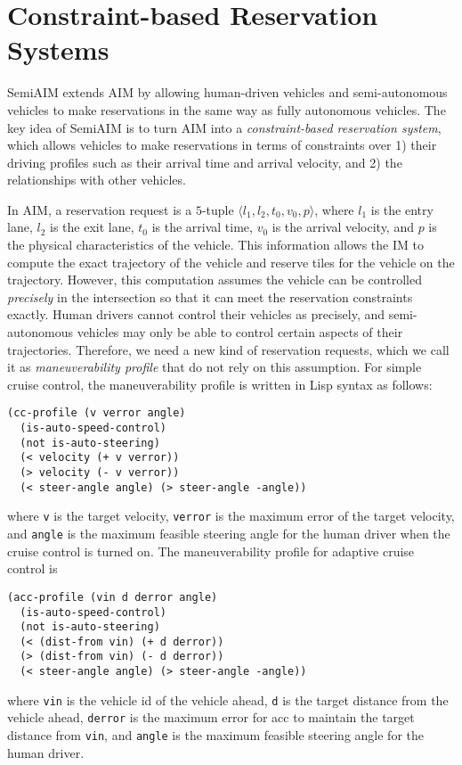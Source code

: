 \section{Constraint-based Reservation Systems}
\label{sec:constraint}

SemiAIM extends AIM by allowing human-driven vehicles and
semi-autonomous vehicles to make reservations in the same way as
fully autonomous vehicles.  The key idea of SemiAIM is to turn AIM into a
\emph{constraint-based reservation system}, which allows vehicles to
make reservations in terms of constraints over 1) their driving
profiles such as their arrival time and arrival velocity, and 2) the
relationships with other vehicles.

In AIM, a reservation request is a $5$-tuple $\langle l_1, l_2, t_0,
v_0, p\rangle$, where $l_1$ is the entry lane, $l_2$ is the exit lane,
$t_0$ is the arrival time, $v_0$ is the arrival velocity, and $p$ is
the physical characteristics of the vehicle.  This information allows
the IM to compute the exact trajectory of the vehicle and reserve
tiles for the vehicle on the trajectory.  However, this computation
assumes the vehicle can be controlled \emph{precisely} in the
intersection so that it can meet the reservation constraints exactly.
Human drivers cannot control their vehicles as precisely, and
semi-autonomous vehicles may only be able to control certain aspects
of their trajectories.  Therefore, we need a new kind of reservation
requests, which we call it as \textit{maneuverability profile} that do
not rely on this assumption. For simple cruise control, the
maneuverability profile is written in Lisp syntax as follows:
\begin{small}
\begin{verbatim}
(cc-profile (v verror angle)
  (is-auto-speed-control)
  (not is-auto-steering)
  (< velocity (+ v verror))
  (> velocity (- v verror))
  (< steer-angle angle) (> steer-angle -angle))
\end{verbatim}
\end{small}
\noindent
where \texttt{v} is the target velocity, \texttt{verror} is the
maximum error of the target velocity, and \texttt{angle} is the
maximum feasible steering angle for the human driver when the cruise
control is turned on.  The maneuverability profile for adaptive cruise
control is
\begin{small}
\begin{verbatim}
(acc-profile (vin d derror angle)
  (is-auto-speed-control)
  (not is-auto-steering)
  (< (dist-from vin) (+ d derror))
  (> (dist-from vin) (- d derror))
  (< steer-angle angle) (> steer-angle -angle))
\end{verbatim}
\end{small}
\noindent
where \texttt{vin} is the vehicle id of the vehicle ahead,
\texttt{d} is the target distance from the vehicle ahead, \texttt{derror}
is the maximum error for acc to maintain the target distance from
\texttt{vin}, and \texttt{angle} is the maximum feasible steering
angle for the human driver.

